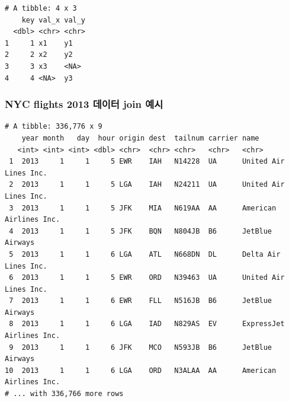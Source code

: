 \documentclass[
  11pt,
]{krantz}
\newenvironment{Shaded}{\begin{snugshade}}{\end{snugshade}}
\newcommand{\CommentTok}[1]{\textcolor[rgb]{0.37,0.37,0.37}{\textit{#1}}}
\newcommand{\DataTypeTok}[1]{\textcolor[rgb]{0.27,0.27,0.27}{#1}}
\newcommand{\KeywordTok}[1]{\textcolor[rgb]{0.27,0.27,0.27}{\textbf{#1}}}
\newcommand{\NormalTok}[1]{#1}
\newcommand{\OperatorTok}[1]{\textcolor[rgb]{0.43,0.43,0.43}{\textbf{#1}}}
\newcommand{\StringTok}[1]{\textcolor[rgb]{0.5,0.5,0.5}{#1}}
\begin{document}
\begin{verbatim}
# A tibble: 4 x 3
    key val_x val_y
  <dbl> <chr> <chr>
1     1 x1    y1   
2     2 x2    y2   
3     3 x3    <NA> 
4     4 <NA>  y3   
\end{verbatim}

\normalsize

\hypertarget{nyc-flights-2013-uxb370uxc774uxd130-join-uxc608uxc2dc}{%
\subsubsection{NYC flights 2013 데이터 join 예시}\label{nyc-flights-2013-uxb370uxc774uxd130-join-uxc608uxc2dc}}

\footnotesize

\begin{Shaded}
\end{Shaded}

\begin{verbatim}
# A tibble: 336,776 x 9
    year month   day  hour origin dest  tailnum carrier name                    
   <int> <int> <int> <dbl> <chr>  <chr> <chr>   <chr>   <chr>                   
 1  2013     1     1     5 EWR    IAH   N14228  UA      United Air Lines Inc.   
 2  2013     1     1     5 LGA    IAH   N24211  UA      United Air Lines Inc.   
 3  2013     1     1     5 JFK    MIA   N619AA  AA      American Airlines Inc.  
 4  2013     1     1     5 JFK    BQN   N804JB  B6      JetBlue Airways         
 5  2013     1     1     6 LGA    ATL   N668DN  DL      Delta Air Lines Inc.    
 6  2013     1     1     5 EWR    ORD   N39463  UA      United Air Lines Inc.   
 7  2013     1     1     6 EWR    FLL   N516JB  B6      JetBlue Airways         
 8  2013     1     1     6 LGA    IAD   N829AS  EV      ExpressJet Airlines Inc.
 9  2013     1     1     6 JFK    MCO   N593JB  B6      JetBlue Airways         
10  2013     1     1     6 LGA    ORD   N3ALAA  AA      American Airlines Inc.  
# ... with 336,766 more rows
\end{verbatim}
\end{document}
